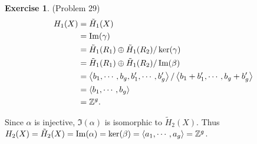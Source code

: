 \documentclass[psamsfonts]{amsart}
\theoremstyle{definition}
\newtheorem*{exer}{Exercise}
\theoremstyle{remark}
\numberwithin{equation}{section}
\begin{document}
\begin{exer}{(Problem 29)}
  \begin{align*}
    H_1(X)
      &= \tilde{H}_1(X) \\
      &= \Im(\gamma) \\
      &= \tilde{H}_1(R_1) \oplus \tilde{H}_1(R_2) / \ker(\gamma) \\
      &= \tilde{H}_1(R_1) \oplus \tilde{H}_1(R_2) / \Im(\beta) \\
      &= \ev{b_1, \cdots, b_g, b_1', \cdots, b_g'} / \ev{b_1 + b_1', \cdots, b_g + b_g'} \\
      &= \ev{b_1, \cdots, b_g} \\
      &= \mathbb{Z}^g.
  \end{align*}

  Since $\alpha$ is injective, $\Im(\alpha)$ is isomorphic to $\tilde{H}_2(X)$.
  Thus $H_2(X) = \tilde{H}_2(X) = \Im(\alpha) = \ker(\beta) = \ev{a_1, \cdots, a_g} = \mathbb{Z}^g$.

\end{exer}
\end{document}
